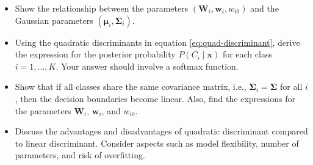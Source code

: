 \documentclass[10pt]{article}
\begin{document}
\begin{enumerate}
\begin{itemize}
	\item[(a)] Show the relationship between the parameters $\left(\mathbf{W}_i, \mathbf{w}_i, w_{i0}\right)$ and the Gaussian parameters $\left(\boldsymbol{\mu}_i, \boldsymbol{\Sigma}_i\right)$. 
	
	\item[(b)] Using the quadratic discriminants in equation \eqref{eq:quad-discriminant}, derive the expression for the posterior probability $P\left(C_i \mid \mathbf{x}\right)$ for each class $i=1,\dots,K$. Your answer should involve a softmax function. 
	
	\item[(c)] Show that if all classes share the same covariance matrix, i.e., $\boldsymbol{\Sigma}_i = \boldsymbol{\Sigma}$ for all $i$, then the decision boundaries become linear. Also, find the expressions for the parameters $\mathbf{W}_{i}$, $\mathbf{w}_{i}$, and $w_{i0}$. 
	
	\item[(d)] Discuss the advantages and disadvantages of quadratic discriminant compared to linear discriminant. Consider aspects such as model flexibility, number of parameters, and risk of overfitting. 
\end{itemize}




\end{enumerate}
\end{document}

